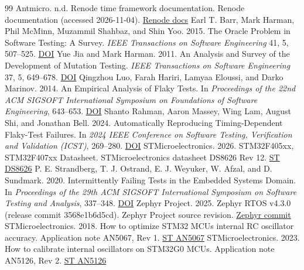 \documentclass[sigconf,nonacm,balance=false]{acmart}
\begin{document}
\begin{thebibliography}{99}
 Antmicro. n.d. Renode time framework documentation. Renode documentation (accessed 2026-11-04). \href{https://renode.readthedocs.io/en/latest/advanced/time_framework.html}{Renode docs}
 Earl T. Barr, Mark Harman, Phil McMinn, Muzammil Shahbaz, and Shin Yoo. 2015. The Oracle Problem in Software Testing: A Survey. \emph{IEEE Transactions on Software Engineering} 41, 5, 507--525. \href{https://doi.org/10.1109/TSE.2014.2372785}{DOI}
 Yue Jia and Mark Harman. 2011. An Analysis and Survey of the Development of Mutation Testing. \emph{IEEE Transactions on Software Engineering} 37, 5, 649--678. \href{https://doi.org/10.1109/TSE.2010.62}{DOI}
 Qingzhou Luo, Farah Hariri, Lamyaa Eloussi, and Darko Marinov. 2014. An Empirical Analysis of Flaky Tests. In \emph{Proceedings of the 22nd ACM SIGSOFT International Symposium on Foundations of Software Engineering}, 643--653. \href{https://doi.org/10.1145/2635868.2635920}{DOI}
 Shanto Rahman, Aaron Massey, Wing Lam, August Shi, and Jonathan Bell. 2024. Automatically Reproducing Timing-Dependent Flaky-Test Failures. In \emph{2024 IEEE Conference on Software Testing, Verification and Validation (ICST)}, 269--280. \href{https://doi.org/10.1109/ICST60714.2024.00032}{DOI}
 STMicroelectronics. 2026. STM32F405xx, STM32F407xx Datasheet. STMicroelectronics datasheet DS8626 Rev 12. \href{https://www.st.com/resource/en/datasheet/stm32f407vg.pdf}{ST DS8626}
 P. E. Strandberg, T. J. Ostrand, E. J. Weyuker, W. Afzal, and D. Sundmark. 2020. Intermittently Failing Tests in the Embedded Systems Domain. In \emph{Proceedings of the 29th ACM SIGSOFT International Symposium on Software Testing and Analysis}, 337--348. \href{https://doi.org/10.1145/3395363.3397359}{DOI}
 Zephyr Project. 2025. Zephyr RTOS v4.3.0 (release commit 3568e1b6d5cd). Zephyr Project source revision. \href{https://github.com/zephyrproject-rtos/zephyr/commit/3568e1b6d5cdd51a6b964a2a1d6d29200fea2056}{Zephyr commit}
 STMicroelectronics. 2018. How to optimize STM32 MCUs internal RC oscillator accuracy. Application note AN5067, Rev 1. \href{https://www.st.com/resource/en/application_note/an5067-how-to-optimize-stm32-mcus-internal-rc-oscillator-accuracy-stmicroelectronics.pdf}{ST AN5067}
 STMicroelectronics. 2023. How to calibrate internal oscillators on STM32G0 MCUs. Application note AN5126, Rev 2. \href{https://www.st.com/resource/en/application_note/an5126-how-to-calibrate-internal-oscillators-on-stm32g0-mcus-stmicroelectronics.pdf}{ST AN5126}

\end{thebibliography}
\end{document}
